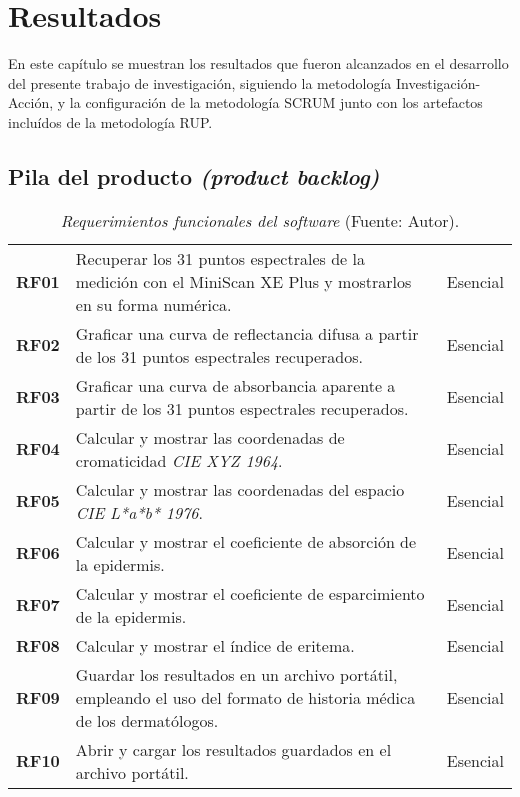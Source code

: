 \chapter{Resultados}

En este cap\'{i}tulo se muestran los resultados que fueron alcanzados en el desarrollo del presente trabajo de investigaci\'{o}n, siguiendo la metodolog\'{i}a Investigaci\'{o}n-Acci\'{o}n, y la configuraci\'{o}n de la metodolog\'{i}a SCRUM junto con los artefactos inclu\'{i}dos de la metodolog\'{i}a RUP.

\section{Pila del producto \textit{(product backlog)}}
	\blindtext
	
	\begin{table}[t]
		\small
		\caption[Requerimientos funcionales del software]{\textit{Requerimientos funcionales del software} (Fuente: Autor).}
		\centering
		\setlength{\extrarowheight}{\altocelda}
		\begin{tabulary}{\anchotabla}{|c|J|c|}
			\hline
			 &  & \\ \hline
			\textbf{RF01} & Recuperar los 31 puntos espectrales de la medici\'{o}n con el MiniScan XE Plus y mostrarlos en su forma num\'{e}rica. & Esencial\\ \hline

			\textbf{RF02} & Graficar una curva de reflectancia difusa a partir de los 31 puntos espectrales recuperados. & Esencial\\ \hline
			\textbf{RF03} & Graficar una curva de absorbancia aparente a partir de los 31 puntos espectrales recuperados. & Esencial\\ \hline
			\textbf{RF04} & Calcular y mostrar las coordenadas de cromaticidad \textit{CIE XYZ 1964}. & Esencial\\ \hline
			\textbf{RF05} & Calcular y mostrar las coordenadas del espacio \textit{CIE L*a*b* 1976}. & Esencial\\ \hline
			\textbf{RF06} & Calcular y mostrar el coeficiente de absorci\'{o}n de la epidermis. & Esencial\\ \hline
			\textbf{RF07} & Calcular y mostrar el coeficiente de esparcimiento de la epidermis. & Esencial\\ \hline
			\textbf{RF08} & Calcular y mostrar el \'{i}ndice de eritema. & Esencial\\ \hline
			\textbf{RF09} & Guardar los resultados en un archivo port\'{a}til, empleando el uso del formato de historia m\'{e}dica de los dermat\'{o}logos. & Esencial\\ \hline
			\textbf{RF10} & Abrir y cargar los resultados guardados en el archivo port\'{a}til. & Esencial\\ \hline
		\end{tabulary}
	\end{table}
	\FloatBarrier
	
